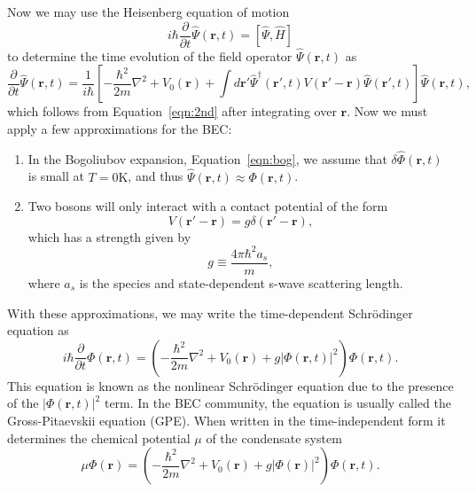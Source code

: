 Now we may use the Heisenberg equation of motion
\begin{equation}
    i\hbar \frac{\partial}{\partial t}\hat \Psi(\mathbf{r},t) = [\hat \Psi, \hat H]
\end{equation}
    to determine the time evolution of the field operator $\hat \Psi(\mathbf{r},t)$ as
\begin{equation}
    \frac{\partial}{\partial t}\hat \Psi(\mathbf{r},t) = \frac{1}{i\hbar}\left[-\frac{\hbar^2}{2m}\nabla^2 + V_0(\mathbf{r}) + \int d\mathbf{r'} \hat \Psi^\dagger(\mathbf{r'}, t)V(\mathbf{r'} -\mathbf{r})\hat \Psi(\mathbf{r'},t)\right]\hat \Psi(\mathbf{r},t),
\end{equation}
which follows from Equation~\eqref{eqn:2nd} after integrating over $\mathbf{r}$. 
Now we must apply a few approximations for the BEC:
\begin{enumerate}
    \item In the Bogoliubov expansion, Equation~\eqref{eqn:bog}, we assume that $\delta \hat \Phi(\mathbf{r},t)$ is small at $T = 0\text{K}$, and thus $\hat \Psi(\mathbf{r},t) \approx \Phi(\mathbf{r},t)$. 
    \item Two bosons will only interact with a contact potential of the form
    \begin{equation}
        V(\mathbf{r'}-\mathbf{r}) = g\delta(\mathbf{r'} - \mathbf{r}),
    \end{equation}
    which has a strength given by
    \begin{equation}
        g \equiv \frac{4 \pi \hbar^2 a_s}{m},
    \end{equation}
    where $a_s$ is the species and state-dependent s-wave scattering length.
\end{enumerate}

With these approximations, we may write the time-dependent Schr\"odinger equation as
\begin{equation}
    i\hbar \frac{\partial}{\partial t}\Phi(\mathbf{r},t) = \left( - \frac{\hbar^2}{2m} \nabla^2 + V_0(\mathbf{r}) + g |\Phi(\mathbf{r},t)|^2\right)\Phi(\mathbf{r},t).
\end{equation}
This equation is known as the nonlinear Schr\"odinger equation due to the presence of the $|\Phi(\mathbf{r},t)|^2$ term.
In the BEC community, the equation is usually called the Gross-Pitaevskii equation (GPE).
When written in the time-independent form it determines the chemical potential $\mu$ of the condensate system~\cite{Gross1961, Pitaevskii1961}
\begin{equation}
    \mu\Phi(\mathbf{r}) = \left( - \frac{\hbar^2}{2m} \nabla^2 + V_0(\mathbf{r}) + g |\Phi(\mathbf{r})|^2\right)\Phi(\mathbf{r},t).
    \label{eqn:GP}
\end{equation}

